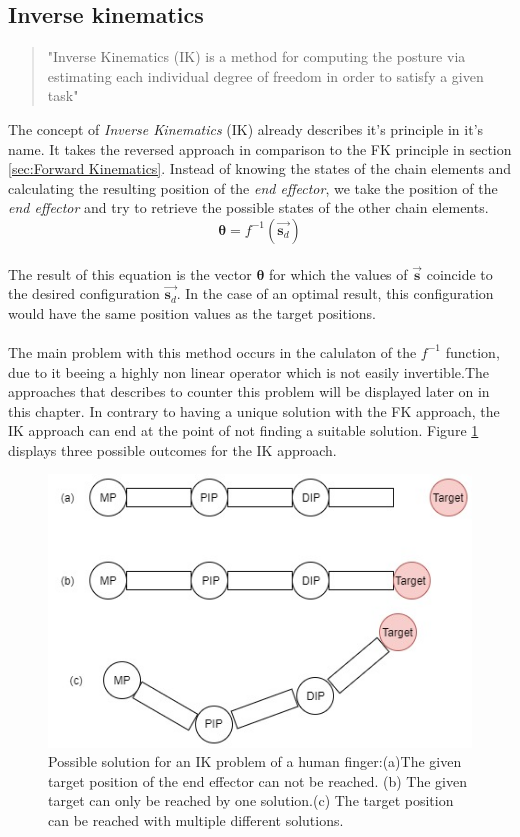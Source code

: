 \subsection{Inverse kinematics}
\label{sec:inverse kinematics}
\begin{quote}"Inverse Kinematics (IK) is a method for computing the posture via estimating each individual degree of freedom in order to satisfy a given task" \cite{AndreasAristidouandJoanLasenby.2009}\end{quote}
The concept of \textit{Inverse Kinematics}  (IK) already describes it's principle in it's name. It takes the reversed approach in comparison to the FK principle in section \ref{sec:Forward Kinematics}. Instead of knowing the states of the chain elements and calculating the resulting position of the \textit{end effector}, we take the position of the \textit{end effector} and try to retrieve the possible states of the other chain elements. \\
\begin{equation}
\label{ik problem formula}
\pmb{\theta}=f^{-1}(\vec{\textbf{s}_{d}})
\end{equation}
\\The result of this equation is the vector $\pmb{\theta}$ for which the values of $\vec{\textbf{s}}$ coincide to the desired configuration $\vec{\textbf{s}_{d}}$. In the case of an optimal result, this configuration would have the same position values as the target positions.\\\\ The main problem with this method occurs in the calulaton of the $f^{-1}$ function, due to it beeing a highly non linear operator which is not easily invertible.The approaches that \cite{AndreasAristidouandJoanLasenby.2009} describes to counter this problem will be displayed later on in this chapter.
In contrary to having a unique solution with the FK approach, the IK approach can end at the point of not finding a suitable solution. Figure \ref{IkSolutions} displays three possible outcomes for the IK approach.
\begin{figure}[H]
\includegraphics[scale=0.6]{images/Ik_figure.jpg}
\caption{Possible solution for an IK problem of a human finger:(a)The given target position of the end effector can not be reached. (b) The given target can only be reached by one solution.(c) The target position can be reached with multiple different solutions.}
\label{IkSolutions}
\end{figure}
